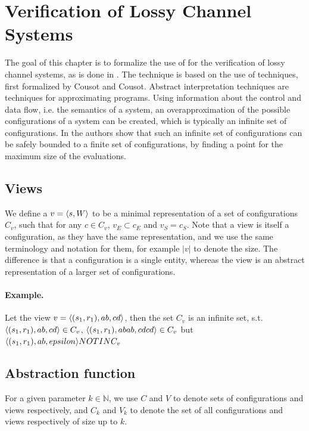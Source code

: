 \newpage
\section{Verification of Lossy Channel Systems}
\label{model}
The goal of this chapter is to formalize the use of  for the verification of lossy channel systems, as is done in \cite{parosh}. The technique is based on the use of  techniques, first formalized by Cousot and Cousot\cite{cousot1977}. Abstract interpretation techniques are techniques for approximating programs. Using information about the control and data flow, i.e. the semantics of a system, an overapproximation of the possible configurations of a system can be created, which is typically an infinite set of configurations. In \cite{parosh} the authors show that such an infinite set of configurations can be safely bounded to a finite set of configurations, by finding a  point for the maximum size of the evaluations.


\subsection{Views}
\label{subwords}
We define a  $v= \langle s, W\rangle$ to be a minimal representation of a set of configurations $C_v$, such that for any $c \in C_v$, $v_E \subset c_E$ and $v_S = c_S$. Note that a view is itself a configuration, as they have the same representation, and we use the same terminology and notation for them, for example $|v|$ to denote the size. The difference is that a configuration is a single entity, whereas the view is an abstract representation of a larger set of configurations.

\paragraph{Example.} Let the view $v = \langle(s_1, r_1), ab, cd\rangle$, then the set $C_v$ is an infinite set, s.t. $\langle(s_1, r_1), ab, cd\rangle \in C_v$, $\langle(s_1, r_1), abab, cdcd\rangle \in C_v$ but $\langle(s_1, r_1), ab, epsilon\rangle NOTIN C_v$


\subsection{Abstraction function}
\label{alphagamma}
For a given parameter $k \in \mathbb{N}$, we use $C$ and $V$ to denote sets of configurations and views respectively, and $C_k$ and $V_k$ to denote the set of all configurations and views respectively of size up to $k$.

